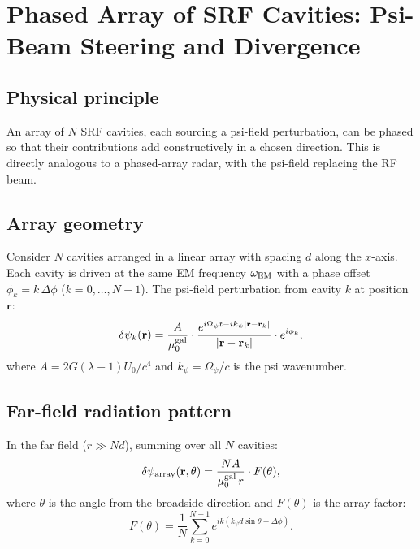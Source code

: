 \documentclass[11pt,twocolumn]{article}
\newcommand{\dpsi}{\delta\psi}
\newcommand{\lam}{\lambda}
\newcommand{\Opsi}{\Omega_\psi}
\begin{document}
\section{Phased Array of SRF Cavities: Psi-Beam Steering and Divergence}
\label{sec:phased_array}

\subsection{Physical principle}

An array of $N$ SRF cavities, each sourcing a psi-field perturbation,
can be phased so that their contributions add constructively in a chosen
direction. This is directly analogous to a phased-array radar, with the
psi-field replacing the RF beam.

\subsection{Array geometry}

Consider $N$ cavities arranged in a linear array with spacing $d$
along the $x$-axis. Each cavity is driven at the same EM frequency
$\omega_{\rm EM}$ with a phase offset $\phi_k = k\,\Delta\phi$
($k = 0,\ldots,N-1$). The psi-field perturbation from cavity $k$
at position $\mathbf{r}$:
\begin{equation}
\dpsi_k(\mathbf{r}) = \frac{A}{\mu_0^{\rm gal}}
\cdot\frac{e^{i\Opsi t - ik_\psi|\mathbf{r}-\mathbf{r}_k|}}
{|\mathbf{r}-\mathbf{r}_k|}\cdot e^{i\phi_k},
\label{eq:dpsi_k}
\end{equation}
where $A = 2G(\lam-1)U_0/c^4$ and $k_\psi = \Opsi/c$ is the psi
wavenumber.

\subsection{Far-field radiation pattern}

In the far field ($r \gg Nd$), summing over all $N$ cavities:
\begin{equation}
\dpsi_{\rm array}(\mathbf{r},\theta) = \frac{NA}{\mu_0^{\rm gal}\,r}
\cdot F(\theta),
\label{eq:dpsi_array}
\end{equation}
where $\theta$ is the angle from the broadside direction and
$F(\theta)$ is the array factor:
\begin{equation}
F(\theta) = \frac{1}{N}\sum_{k=0}^{N-1}
e^{i k(k_\psi d\sin\theta + \Delta\phi)}.
\label{eq:array_factor}
\end{equation}
\end{document}
